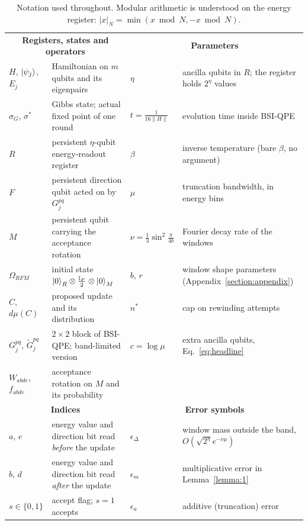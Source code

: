 \documentclass[aps,floatfix,10pt,amssymb,amsfont,amsmath,superscriptaddress,float,nofootinbib,longbibliography,nobalancelastpage,twocolumn]{revtex4-2}
\begin{document}
\begin{table}
\caption{Notation used throughout. Modular arithmetic is understood on the energy register: $|x|_N = \min(x \bmod N, -x \bmod N)$.}
\label{tab:notation}
\begin{ruledtabular}
\footnotesize
\begin{tabular}{ll@{\quad}ll}
\multicolumn{2}{c}{\textbf{Registers, states and operators}} & \multicolumn{2}{c}{\textbf{Parameters}}\\[2pt]
$H$, $\ket{\psi_j}$, $E_j$ & Hamiltonian on $m$ qubits and its eigenpairs & $\eta$ & ancilla qubits in $R$; the register holds $2^{\eta}$ values\\
$\sigma_G$, $\sigma^*$ & Gibbs state; actual fixed point of one round & $t=\frac{1}{16\|H\|}$ & evolution time inside BSI-QPE\\
$R$ & persistent $\eta$-qubit energy-readout register & $\beta$ & inverse temperature (bare $\beta$, no argument)\\
$F$ & persistent direction qubit acted on by $G^{pq}_j$ & $\mu$ & truncation bandwidth, in energy bins\\
$M$ & persistent qubit carrying the acceptance rotation & $\nu=\frac13\sin^2\frac{\pi}{4b}$ & Fourier decay rate of the windows\\
$\Omega_{RFM}$ & initial state $\ket{0}_R\otimes\frac{\mathbb I_F}{2}\otimes\ket{0}_M$ & $b$, $r$ & window shape parameters (Appendix~\ref{section:appendix})\\
$C$, $d\mu(C)$ & proposed update and its distribution & $n^*$ & cap on rewinding attempts\\
$G^{pq}_j$, $\tilde G^{pq}_j$ & $2\times2$ block of BSI-QPE; band-limited version & $c=\log\mu$ & extra ancilla qubits, Eq.~\eqref{eq:headline}\\
$W_{abde}$, $f_{abde}$ & acceptance rotation on $M$ and its probability & &\\[4pt]
\multicolumn{2}{c}{\textbf{Indices}} & \multicolumn{2}{c}{\textbf{Error symbols}}\\[2pt]
$a$, $e$ & energy value and direction bit read \emph{before} the update & $\epsilon_{\Delta}$ & window mass outside the band, $O(\sqrt{2^{\eta}}e^{-\nu\mu})$\\
$b$, $d$ & energy value and direction bit read \emph{after} the update & $\epsilon_m$ & multiplicative error in Lemma~\ref{lemma:1}\\
$s\in\{0,1\}$ & accept flag; $s=1$ accepts & $\epsilon_a$ & additive (truncation) error\\

\end{tabular}
\end{ruledtabular}
\end{table}
\end{document}
